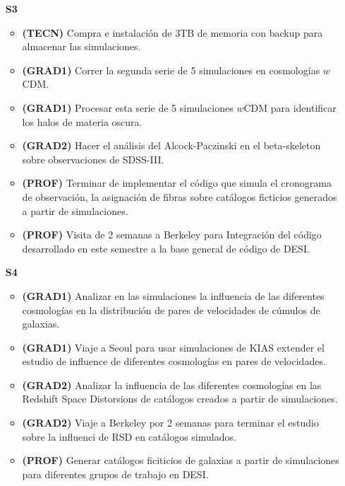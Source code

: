 \begin{itemize}
\item[\bf S3]
\begin{itemize}
\item {\bf (TECN)} Compra e instalaci\'on de 3TB de memoria con backup
  para almacenar las simulaciones. 
\item {\bf (GRAD1)} Correr la segunda serie de 5 simulaciones en 
  cosmolog\'ias $w$CDM.  
\item {\bf (GRAD1)} Procesar esta serie de 5 simulaciones $w$CDM para
  identificar los halos de materia oscura. 
\item {\bf (GRAD2)} Hacer el an\'alisis
  del Alcock-Paczinski en el beta-skeleton sobre observaciones de
  SDSS-III. 
\item {\bf (PROF)} Terminar de implementar el c\'odigo que simula el
  cronograma de observaci\'on, la asignaci\'on de fibras sobre
  cat\'alogos ficticios generados a partir de simulaciones.
\item {\bf (PROF)} Visita de 2 semanas a Berkeley para Integraci\'on del
  c\'odigo desarrollado en este semestre a la base general de c\'odigo
  de DESI. 
\end{itemize}

\item[\bf S4]
\begin{itemize}
\item {\bf (GRAD1)} Analizar en las simulaciones la influencia de las diferentes
  cosmolog\'ias en la distribuci\'on de pares de velocidades de
  c\'umulos de galaxias.
\item {\bf (GRAD1)} Viaje a Seoul para usar simulaciones de KIAS extender el estudio de  influence de diferentes cosmolog\'ias en pares de velocidades.
\item {\bf (GRAD2)} Analizar la influencia de las diferentes
  cosmolog\'ias en las Redshift Space Distorsions de cat\'alogos
  creados a partir de simulaciones.
\item {\bf (GRAD2)} Viaje a Berkeley por 2 semanas para terminar el
  estudio sobre la influenci de RSD en cat\'alogos simulados.
\item {\bf (PROF)} Generar cat\'alogos ficiticios de galaxias a partir
  de simulaciones para diferentes grupos de trabajo en DESI.
\end{itemize}



\end{itemize}
